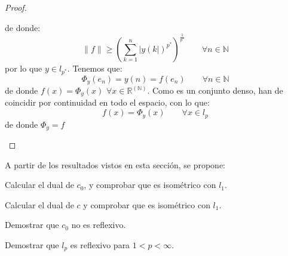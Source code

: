 \begin{prop}
\begin{proof}
\begin{itemize}
\begin{equation*}
                \end{equation*}
                de donde:
                \begin{equation*}
                    \|f\| \geq {\left(\sum_{k=1}^{n}{|y(k|)}^{p^\ast}\right)}^{\frac{1}{p^\ast}} \qquad \forall n\in \mathbb{N}
                \end{equation*}
                por lo que $y\in l_{p^\ast}$. Tenemos que:
                \begin{equation*}
                    \Phi_y(e_n) = y(n) = f(e_n) \qquad \forall n\in \mathbb{N}
                \end{equation*}
                de donde $f(x) = \Phi_y(x)$ $\forall x\in \mathbb{R}^{(\mathbb{N})}$. Como es un conjunto denso, han de coincidir por continuidad en todo el espacio, con lo que:
                \begin{equation*}
                    f(x) = \Phi_y(x) \qquad \forall x\in l_p
                \end{equation*}
                de donde $\Phi_y = f$
        \end{itemize}
    \end{proof}
\end{prop}

\noindent
A partir de los resultados vistos en esta sección, se propone:
\begin{ejercicio}
    Calcular el dual de $c_0$, y comprobar que es isométrico con $l_1$.
\end{ejercicio}

\begin{ejercicio}
    Calcular el dual de $c$ y comprobar que es isométrico con $l_1$.
\end{ejercicio}

\begin{ejercicio}
    Demostrar que $c_0$ no es reflexivo.
\end{ejercicio}

\begin{ejercicio}
    Demostrar que $l_p$ es reflexivo para $1<p<\infty$.
\end{ejercicio}





